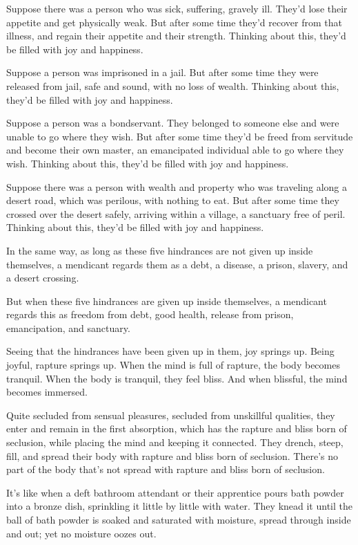 \documentclass[12pt,openany]{book}%
\begin{document}
Suppose there was a person who was sick, suffering, gravely ill. They’d lose their appetite and get physically weak. But after some time they’d recover from that illness, and regain their appetite and their strength. Thinking about this, they’d be filled with joy and happiness. 

Suppose a person was imprisoned in a jail. But after some time they were released from jail, safe and sound, with no loss of wealth. Thinking about this, they’d be filled with joy and happiness. 

Suppose a person was a bondservant. They belonged to someone else and were unable to go where they wish. But after some time they’d be freed from servitude and become their own master, an emancipated individual able to go where they wish. Thinking about this, they’d be filled with joy and happiness. 

Suppose there was a person with wealth and property who was traveling along a desert road, which was perilous, with nothing to eat. But after some time they crossed over the desert safely, arriving within a village, a sanctuary free of peril. Thinking about this, they’d be filled with joy and happiness. 

In the same way, as long as these five hindrances are not given up inside themselves, a mendicant regards them as a debt, a disease, a prison, slavery, and a desert crossing. 

But when these five hindrances are given up inside themselves, a mendicant regards this as freedom from debt, good health, release from prison, emancipation, and sanctuary. 

Seeing that the hindrances have been given up in them, joy springs up. Being joyful, rapture springs up. When the mind is full of rapture, the body becomes tranquil. When the body is tranquil, they feel bliss. And when blissful, the mind becomes immersed. 

Quite secluded from sensual pleasures, secluded from unskillful qualities, they enter and remain in the first absorption, which has the rapture and bliss born of seclusion, while placing the mind and keeping it connected. They drench, steep, fill, and spread their body with rapture and bliss born of seclusion. There’s no part of the body that’s not spread with rapture and bliss born of seclusion. 

It’s like when a deft bathroom attendant or their apprentice pours bath powder into a bronze dish, sprinkling it little by little with water. They knead it until the ball of bath powder is soaked and saturated with moisture, spread through inside and out; yet no moisture oozes out. 
\end{document}
